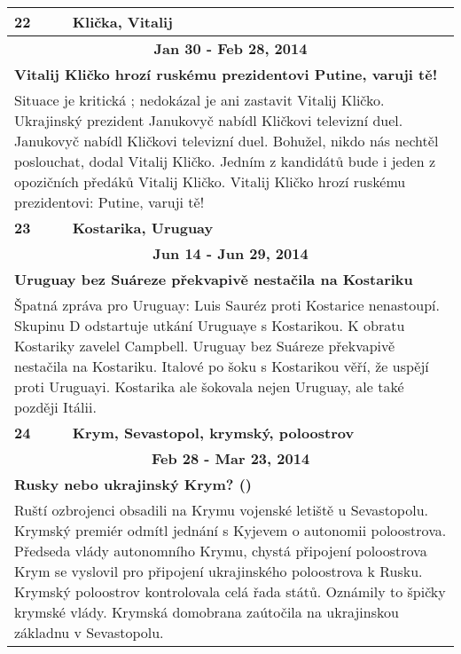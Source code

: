 \begin{tabularx}{\linewidth}{l l}
            \bf 22 & \bf Klička, Vitalij \\ \midrule
            
                \multicolumn{2}{c}{\bf Jan 30 - Feb 28, 2014} \\
                \multicolumn{2}{p{\linewidth}}{\bf Vitalij Kličko hrozí ruskému prezidentovi Putine, varuji tě!} \\
                \multicolumn{2}{p{\linewidth}}{Situace je kritická ; nedokázal je ani zastavit Vitalij Kličko. Ukrajinský prezident Janukovyč nabídl Kličkovi televizní duel. Janukovyč nabídl Kličkovi televizní duel. Bohužel, nikdo nás nechtěl poslouchat,  dodal Vitalij Kličko. Jedním z kandidátů bude i jeden z opozičních předáků Vitalij Kličko. Vitalij Kličko hrozí ruskému prezidentovi: Putine, varuji tě!} \\ \midrule
                [1.5pt]

            \bf 23 & \bf Kostarika, Uruguay \\ \midrule
            
                \multicolumn{2}{c}{\bf Jun 14 - Jun 29, 2014} \\
                \multicolumn{2}{p{\linewidth}}{\bf Uruguay bez Suáreze překvapivě nestačila na Kostariku} \\
                \multicolumn{2}{p{\linewidth}}{Špatná zpráva pro Uruguay: Luis Sauréz proti Kostarice nenastoupí. Skupinu D odstartuje utkání Uruguaye s Kostarikou. K obratu Kostariky zavelel Campbell. Uruguay bez Suáreze překvapivě nestačila na Kostariku. Italové po šoku s Kostarikou věří, že uspějí proti Uruguayi. Kostarika ale šokovala nejen Uruguay, ale také později Itálii.} \\ \midrule
                [1.5pt]

            \bf 24 & \bf Krym, Sevastopol, krymský, poloostrov \\ \midrule
            
                \multicolumn{2}{c}{\bf Feb 28 - Mar 23, 2014} \\
                \multicolumn{2}{p{\linewidth}}{\bf Rusky nebo ukrajinský Krym? ()} \\
                \multicolumn{2}{p{\linewidth}}{Ruští ozbrojenci obsadili na Krymu vojenské letiště u Sevastopolu. Krymský premiér odmítl jednání s Kyjevem o autonomii poloostrova. Předseda vlády autonomního Krymu, chystá připojení poloostrova Krym se vyslovil pro připojení ukrajinského poloostrova k Rusku. Krymský poloostrov kontrolovala celá řada států. Oznámily to špičky krymské vlády. Krymská domobrana zaútočila na ukrajinskou základnu v Sevastopolu.} \\ \midrule
                [1.5pt]


\end{tabularx}
